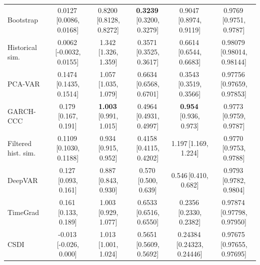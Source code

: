 \begin{table}[H]
{\begin{tabular}{@{}lccccc@{}}
Bootstrap & 0.0127\,[0.0086, 0.0168] & 0.8200\,[0.8128, 0.8272] & \textbf{0.3239}\,[0.3200, 0.3279] & 0.9047\,[0.8974, 0.9119] & 0.9769\,[0.9751, 0.9787] \\
Historical sim. & 0.0062\,[-0.0032, 0.0155] & 1.342\,[1.326, 1.359] & 0.3571\,[0.3525, 0.3617] & 0.6614\,[0.6544, 0.6683] & 0.98079\,[0.98014, 0.98144] \\
PCA-VAR & 0.1474\,[0.1435, 0.1514] & 1.057\,[1.035, 1.079] & 0.6634\,[0.6568, 0.6701] & 0.3543\,[0.3519, 0.3566] & 0.97756\,[0.97659, 0.97853] \\
GARCH-CCC & 0.179\,[0.167, 0.191] & \textbf{1.003}\,[0.991, 1.015] & 0.4964\,[0.4931, 0.4997] & \textbf{0.954}\,[0.936, 0.973] & 0.9773\,[0.9759, 0.9787] \\
Filtered hist. sim. & 0.1109\,[0.1030, 0.1188] & 0.934\,[0.915, 0.952] & 0.4158\,[0.4115, 0.4202] & 1.197\,[1.169, 1.224] & 0.9770\,[0.9753, 0.9788] \\
DeepVAR & 0.127\,[0.093, 0.161] & 0.887\,[0.843, 0.930] & 0.570\,[0.500, 0.639] & 0.546\,[0.410, 0.682] & 0.9793\,[0.9782, 0.9804] \\
TimeGrad & 0.161\,[0.133, 0.189] & 1.003\,[0.929, 1.077] & 0.6533\,[0.6516, 0.6550] & 0.2356\,[0.2330, 0.2382] & 0.97874\,[0.97798, 0.97950] \\
CSDI & -0.013\,[-0.026, 0.000] & 1.013\,[1.001, 1.024] & 0.5651\,[0.5609, 0.5692] & 0.24384\,[0.24323, 0.24446] & 0.97675\,[0.97655, 0.97695] \\
\bottomrule
\end{tabular}%
}
\end{table}

